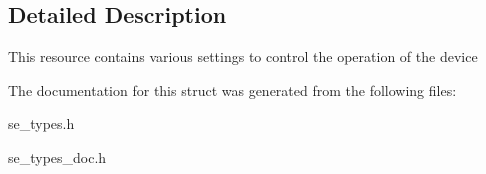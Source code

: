 \subsection{Detailed Description}
This resource contains various settings to control the operation of the device 

The documentation for this struct was generated from the following files\+:\begin{DoxyCompactItemize}
\item 
se\+\_\+types.\+h\item 
se\+\_\+types\+\_\+doc.\+h\end{DoxyCompactItemize}
